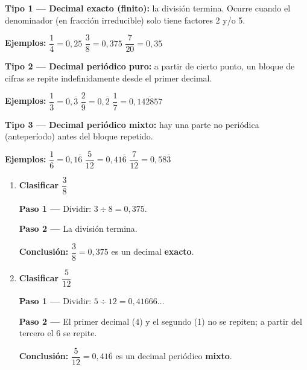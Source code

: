 \documentclass[11pt, letterpaper]{article}
\begin{document}
\begin{tcolorbox}[importantbox, title={Tipos de representaci\'on decimal de un racional}]
\noindent\textbf{Tipo 1 --- Decimal exacto (finito):} la divisi\'on termina. Ocurre cuando el denominador (en fracci\'on irreducible) solo tiene factores 2 y/o 5.

\medskip

\noindent\textbf{Ejemplos:} $\dfrac{1}{4} = 0{,}25$ \quad $\dfrac{3}{8} = 0{,}375$ \quad $\dfrac{7}{20} = 0{,}35$

\medskip

\noindent\textbf{Tipo 2 --- Decimal peri\'odico puro:} a partir de cierto punto, un bloque de cifras se repite indefinidamente desde el primer decimal.

\medskip

\noindent\textbf{Ejemplos:} $\dfrac{1}{3} = 0{,}\overline{3}$ \quad $\dfrac{2}{9} = 0{,}\overline{2}$ \quad $\dfrac{1}{7} = 0{,}\overline{142857}$

\medskip

\noindent\textbf{Tipo 3 --- Decimal peri\'odico mixto:} hay una parte no peri\'odica (anteper\'iodo) antes del bloque repetido.

\medskip

\noindent\textbf{Ejemplos:} $\dfrac{1}{6} = 0{,}1\overline{6}$ \quad $\dfrac{5}{12} = 0{,}41\overline{6}$ \quad $\dfrac{7}{12} = 0{,}58\overline{3}$
\end{tcolorbox}

\begin{tcolorbox}[examplebox, title={Ejemplos --- clasificar representaciones decimales}]
\begin{enumerate}[label=\textbf{Ej. \arabic*.}, leftmargin=*, itemsep=12pt]

\item \textbf{Clasificar $\dfrac{3}{8}$}

\textbf{Paso 1 ---} Dividir: $3 \div 8 = 0{,}375$.

\textbf{Paso 2 ---} La divisi\'on termina.

\textbf{Conclusi\'on:} $\dfrac{3}{8} = 0{,}375$ es un decimal \textbf{exacto}. \checkmark

\item \textbf{Clasificar $\dfrac{5}{12}$}

\textbf{Paso 1 ---} Dividir: $5 \div 12 = 0{,}41666\ldots$

\textbf{Paso 2 ---} El primer decimal (4) y el segundo (1) no se repiten; a partir del tercero el 6 se repite.

\textbf{Conclusi\'on:} $\dfrac{5}{12} = 0{,}41\overline{6}$ es un decimal peri\'odico \textbf{mixto}. \checkmark

\end{enumerate}
\end{tcolorbox}
\end{document}
